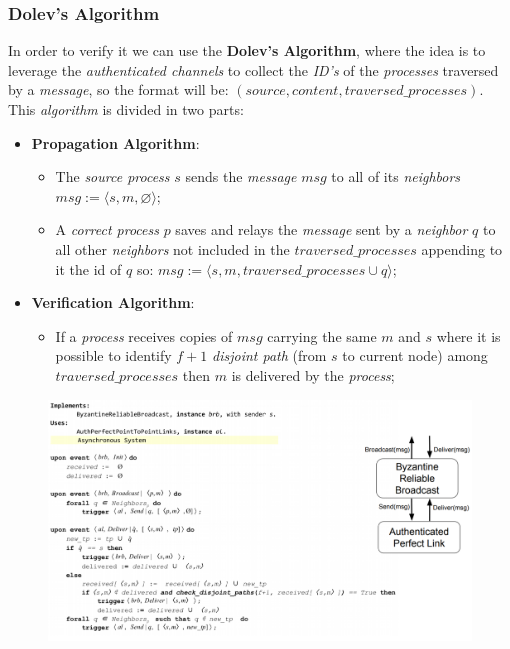 \documentclass{article}
\begin{document}
\subsubsection{Dolev's Algorithm}
In order to verify it we can use the \textbf{Dolev's Algorithm}, where the idea is to leverage the \emph{authenticated channels} to collect the \emph{ID's} of the \emph{processes} traversed by a \emph{message}, so the format will be: $(source, content, traversed\_processes)$. This \emph{algorithm} is divided in two parts:
\begin{itemize}
\item \textbf{Propagation Algorithm}:
\begin{itemize}
\item The \emph{source process} $s$ sends the \emph{message} $msg$ to all of its \emph{neighbors} $msg := \langle s,m,\varnothing \rangle$;
\item A \emph{correct process} $p$ saves and relays the \emph{message} sent by a \emph{neighbor} $q$ to all other \emph{neighbors} not included in the $traversed\_processes$ appending to it the id of $q$ so:  $msg := \langle s,m,traversed\_processes \cup q \rangle$;
\end{itemize}
\item \textbf{Verification Algorithm}:
\begin{itemize}
\item If a \emph{process} receives copies of $msg$ carrying the same $m$ and $s$ where it is possible to identify $f+1$ \emph{disjoint path} (from $s$ to current node) among $traversed\_processes$ then $m$ is delivered by the \emph{process};
\end{itemize}
\end{itemize}
\begin{figure}[H]
  \centering
  \includegraphics[scale=0.8,left]{cattura95.png}
\end{figure}
\end{document}
